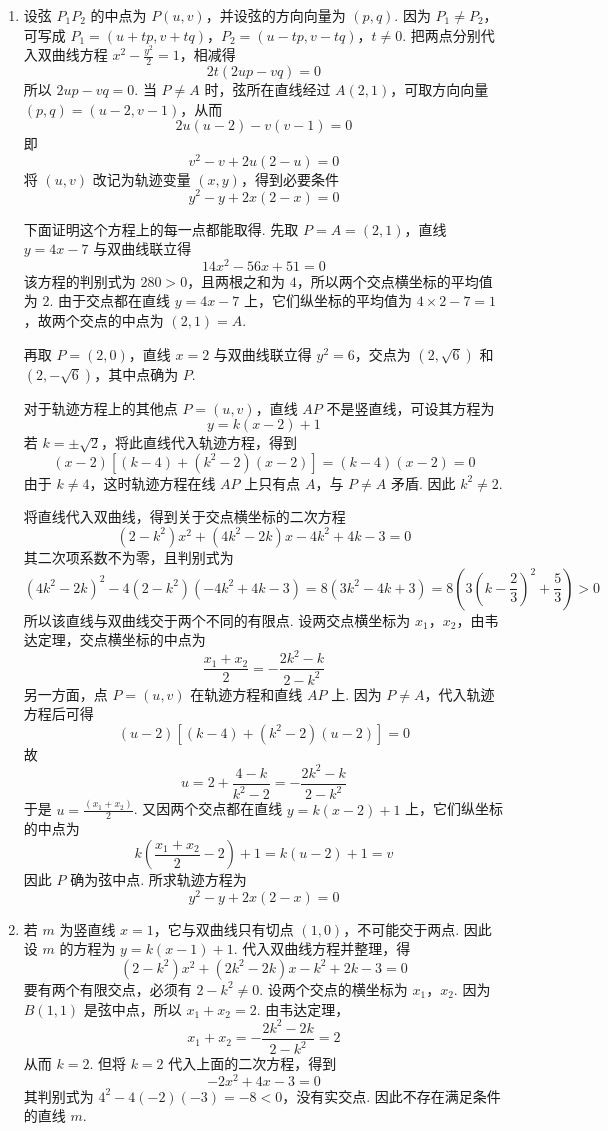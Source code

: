\documentclass[UTF8,a4paper,oneside,11pt]{ctexbook}
\begin{document}
\begin{solution}
\begin{enumerate}
\item 设弦 \(P_1P_2\) 的中点为 \(P(u,v)\)，并设弦的方向向量为 \((p,q)\). 因为 \(P_1\ne P_2\)，可写成
\(P_1=(u+tp,v+tq)\)，\(P_2=(u-tp,v-tq)\)，\(t\ne0\).
把两点分别代入双曲线方程 \(x^2-\frac{y^2}{2}=1\)，相减得
\[
2t\left(2up-vq\right)=0
\]
所以 \(2up-vq=0\). 当 \(P\ne A\) 时，弦所在直线经过 \(A(2,1)\)，可取方向向量 \((p,q)=(u-2,v-1)\)，从而
\[
2u(u-2)-v(v-1)=0
\]
即
\[
v^2-v+2u(2-u)=0
\]
将 \((u,v)\) 改记为轨迹变量 \((x,y)\)，得到必要条件
\[
y^2-y+2x(2-x)=0
\]

下面证明这个方程上的每一点都能取得. 先取 \(P=A=(2,1)\)，直线 \(y=4x-7\) 与双曲线联立得
\[
14x^2-56x+51=0
\]
该方程的判别式为 \(280>0\)，且两根之和为 \(4\)，所以两个交点横坐标的平均值为 \(2\). 由于交点都在直线 \(y=4x-7\) 上，它们纵坐标的平均值为 \(4\times2-7=1\)，故两个交点的中点为 \((2,1)=A\).

再取 \(P=(2,0)\)，直线 \(x=2\) 与双曲线联立得 \(y^2=6\)，交点为 \((2,\sqrt6)\) 和 \((2,-\sqrt6)\)，其中点确为 \(P\).

对于轨迹方程上的其他点 \(P=(u,v)\)，直线 \(AP\) 不是竖直线，可设其方程为
\[
y=k(x-2)+1
\]
若 \(k=\pm\sqrt2\)，将此直线代入轨迹方程，得到
\[
(x-2)\left[(k-4)+(k^2-2)(x-2)\right]=(k-4)(x-2)=0
\]
由于 \(k\ne4\)，这时轨迹方程在线 \(AP\) 上只有点 \(A\)，与 \(P\ne A\) 矛盾. 因此 \(k^2\ne2\).

将直线代入双曲线，得到关于交点横坐标的二次方程
\[
(2-k^2)x^2+(4k^2-2k)x-4k^2+4k-3=0
\]
其二次项系数不为零，且判别式为
\[
(4k^2-2k)^2-4(2-k^2)(-4k^2+4k-3)
=8(3k^2-4k+3)=8\left(3\left(k-\frac23\right)^2+\frac53\right)>0
\]
所以该直线与双曲线交于两个不同的有限点. 设两交点横坐标为 \(x_1\)，\(x_2\)，由韦达定理，交点横坐标的中点为
\[
\frac{x_1+x_2}{2}=-\frac{2k^2-k}{2-k^2}
\]
另一方面，点 \(P=(u,v)\) 在轨迹方程和直线 \(AP\) 上. 因为 \(P\ne A\)，代入轨迹方程后可得
\[
(u-2)\left[(k-4)+(k^2-2)(u-2)\right]=0
\]
故
\[
u=2+\frac{4-k}{k^2-2}=-\frac{2k^2-k}{2-k^2}
\]
于是 \(u=\frac{(x_1+x_2)}{2}\). 又因两个交点都在直线 \(y=k(x-2)+1\) 上，它们纵坐标的中点为
\[
k\left(\frac{x_1+x_2}{2}-2\right)+1=k(u-2)+1=v
\]
因此 \(P\) 确为弦中点. 所求轨迹方程为
\[
y^2-y+2x(2-x)=0
\]
\item 若 \(m\) 为竖直线 \(x=1\)，它与双曲线只有切点 \((1,0)\)，不可能交于两点. 因此设 \(m\) 的方程为 \(y=k(x-1)+1\). 代入双曲线方程并整理，得
\[
(2-k^2)x^2+(2k^2-2k)x-k^2+2k-3=0
\]
要有两个有限交点，必须有 \(2-k^2\ne0\). 设两个交点的横坐标为 \(x_1\)，\(x_2\). 因为 \(B(1,1)\) 是弦中点，所以 \(x_1+x_2=2\). 由韦达定理，
\[
x_1+x_2=-\frac{2k^2-2k}{2-k^2}=2
\]
从而 \(k=2\). 但将 \(k=2\) 代入上面的二次方程，得到
\[
-2x^2+4x-3=0
\]
其判别式为 \(4^2-4(-2)(-3)=-8<0\)，没有实交点. 因此不存在满足条件的直线 \(m\).
\end{enumerate}
\end{solution}
\end{document}
